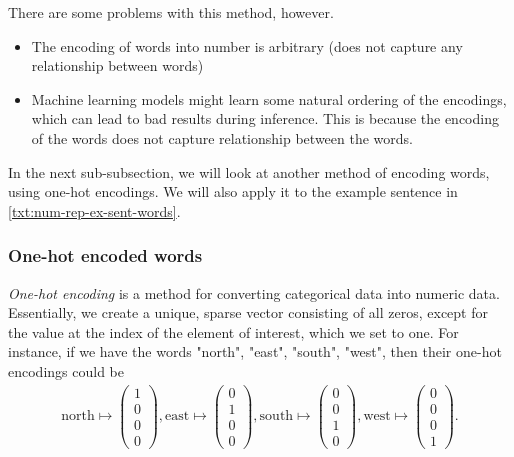 There are some problems with this method, however.
\begin{itemize}
    \item The encoding of words into number is arbitrary (does not capture any relationship between words)
    \item Machine learning models might learn some natural ordering of the encodings, which can lead to bad results during inference. This is because the encoding of the words does not capture relationship between the words.
\end{itemize}

In the next sub-subsection, we will look at another method of encoding words, using one-hot encodings. We will also apply it to the example sentence in \cref{txt:num-rep-ex-sent-words}.

\subsubsection{One-hot encoded words}
\textit{One-hot encoding} is a method for converting categorical data into numeric data. Essentially, we create a unique, sparse vector consisting of all zeros, except for the value at the index of the element of interest, which we set to one. For instance, if we have the words "north", "east", "south", "west", then their one-hot encodings could be
\begin{align}
    \text{north} \mapsto \begin{pmatrix}
    1\\
    0\\
    0\\
    0
    \end{pmatrix},
    \text{east} \mapsto \begin{pmatrix}
    0\\
    1\\
    0\\
    0
    \end{pmatrix},
    \text{south} \mapsto \begin{pmatrix}
    0\\
    0\\
    1\\
    0
    \end{pmatrix},
    \text{west} \mapsto \begin{pmatrix}
    0\\
    0\\
    0\\
    1
    \end{pmatrix}.
\end{align}

